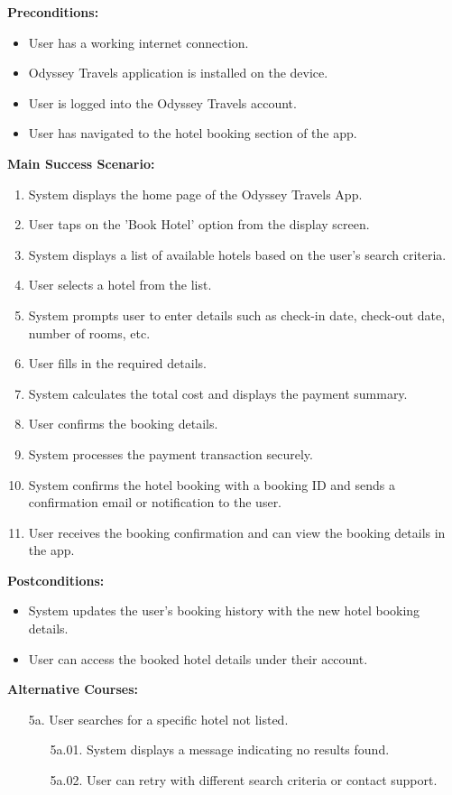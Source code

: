 \documentclass{scrreprt}
\begin{document}
\textbf{Preconditions:}
\begin{itemize}
    \item User has a working internet connection.
    \item Odyssey Travels application is installed on the device.
    \item User is logged into the Odyssey Travels account.
    \item User has navigated to the hotel booking section of the app.
\end{itemize}

\textbf{Main Success Scenario:}
\begin{enumerate}
    \item System displays the home page of the Odyssey Travels App.
    \item User taps on the 'Book Hotel' option from the display screen.
    \item System displays a list of available hotels based on the user's search criteria.
    \item User selects a hotel from the list.
    \item System prompts user to enter details such as check-in date, check-out date, number of rooms, etc.
    \item User fills in the required details.
    \item System calculates the total cost and displays the payment summary.
    \item User confirms the booking details.
    \item System processes the payment transaction securely.
    \item System confirms the hotel booking with a booking ID and sends a confirmation email or notification to the user.
    \item User receives the booking confirmation and can view the booking details in the app.
\end{enumerate}

\textbf{Postconditions:}
\begin{itemize}
    \item System updates the user's booking history with the new hotel booking details.
    \item User can access the booked hotel details under their account.
\end{itemize}

\textbf{Alternative Courses:}
\begin{itemize}
    \item[5a.] User searches for a specific hotel not listed.
    \begin{itemize}
        \item[5a.01.] System displays a message indicating no results found.
        \item[5a.02.] User can retry with different search criteria or contact support.
    \end{itemize}
\end{itemize}
\end{document}
